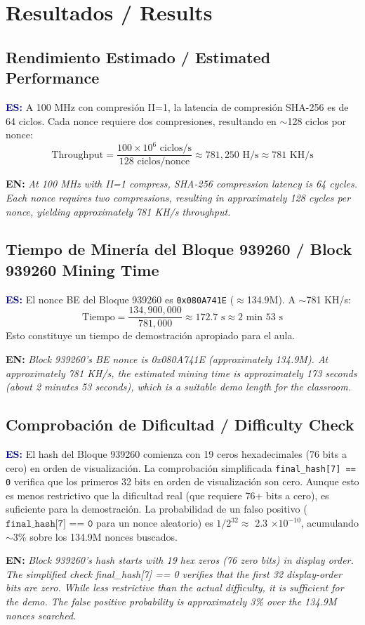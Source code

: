 \documentclass[12pt,a4paper]{article}
\newcommand{\bsection}[2]{%
    \section{#1 \textnormal{\normalsize\color{accentblue}/ #2}}%
}
\newcommand{\bsubsection}[2]{%
    \subsection{#1 \textnormal{\small\color{accentblue}/ #2}}%
}
\newenvironment{bilingual}{%
    \par\medskip
}{%
    \par\medskip
}
\newcommand{\espara}[1]{\noindent\textcolor{darkblue}{\textbf{ES:}} #1\par\smallskip}
\newcommand{\enpara}[1]{\noindent\textcolor{accentblue}{\textbf{EN:}} \textit{#1}\par\smallskip}
\begin{document}
\bsection{Resultados}{Results}

\bsubsection{Rendimiento Estimado}{Estimated Performance}

\begin{bilingual}
\espara{%
A 100 MHz con compresi\'on II=1, la latencia de compresi\'on SHA-256 es de 64 ciclos.
Cada nonce requiere dos compresiones, resultando en $\sim$128 ciclos por nonce:
\[
    \text{Throughput} = \frac{100 \times 10^6 \text{ ciclos/s}}{128 \text{ ciclos/nonce}}
    \approx 781{,}250 \text{ H/s} \approx 781 \text{ KH/s}
\]}

\enpara{%
At 100 MHz with II=1 compress, SHA-256 compression latency is 64 cycles.
Each nonce requires two compressions, resulting in approximately 128 cycles
per nonce, yielding approximately 781 KH/s throughput.}
\end{bilingual}

\bsubsection{Tiempo de Miner\'ia del Bloque 939260}{Block 939260 Mining Time}

\begin{bilingual}
\espara{%
El nonce BE del Bloque 939260 es \texttt{0x080A741E} ($\approx$134.9M).
A $\sim$781 KH/s:
\[
    \text{Tiempo} = \frac{134{,}900{,}000}{781{,}000} \approx 172.7 \text{ s}
    \approx 2 \text{ min } 53 \text{ s}
\]
Esto constituye un tiempo de demostraci\'on apropiado para el aula.}

\enpara{%
Block 939260's BE nonce is 0x080A741E (approximately 134.9M). At approximately
781 KH/s, the estimated mining time is approximately 173 seconds (about 2 minutes
53 seconds), which is a suitable demo length for the classroom.}
\end{bilingual}

\bsubsection{Comprobaci\'on de Dificultad}{Difficulty Check}

\begin{bilingual}
\espara{%
El hash del Bloque 939260 comienza con 19 ceros hexadecimales (76 bits a cero)
en orden de visualizaci\'on. La comprobaci\'on simplificada \texttt{final\_hash[7] == 0}
verifica que los primeros 32 bits en orden de visualizaci\'on son cero. Aunque esto
es menos restrictivo que la dificultad real (que requiere 76+ bits a cero), es
suficiente para la demostraci\'on. La probabilidad de un falso positivo
($\texttt{final\_hash[7] == 0}$ para un nonce aleatorio) es $1/2^{32} \approx$
2.3 $\times 10^{-10}$, acumulando $\sim$3\% sobre los 134.9M nonces buscados.}

\enpara{%
Block 939260's hash starts with 19 hex zeros (76 zero bits) in display order.
The simplified check final\_hash[7] == 0 verifies that the first 32 display-order
bits are zero. While less restrictive than the actual difficulty, it is sufficient
for the demo. The false positive probability is approximately 3\% over the
134.9M nonces searched.}
\end{bilingual}
\end{document}
